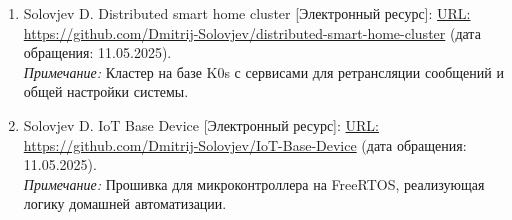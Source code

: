 \documentclass[a4paper,12pt]{article}
\begin{document}
\begin{enumerate}[label=\arabic*.]
  \item Solovjev D. Distributed smart home cluster  [Электронный ресурс]: 
        \url{URL: https://github.com/Dmitrij-Solovjev/distributed-smart-home-cluster}
        (дата обращения: 11.05.2025). \\
        \emph{Примечание:} Кластер на базе K0s с сервисами для ретрансляции сообщений и общей настройки системы.
        
  \item Solovjev D. IoT Base Device [Электронный ресурс]: 
        \url{URL: https://github.com/Dmitrij-Solovjev/IoT-Base-Device} 
        (дата обращения: 11.05.2025). \\
        \emph{Примечание:} Прошивка для микроконтроллера на FreeRTOS, реализующая логику домашней автоматизации.
\end{enumerate}
\end{document}
